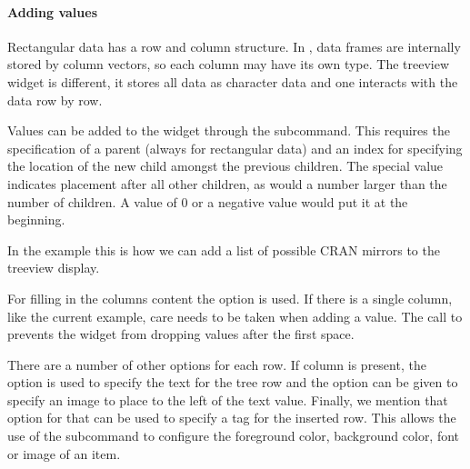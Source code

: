 \paragraph{Adding values}

Rectangular data has a row and column structure. In \R, data frames
are internally stored by column vectors, so each column may have its
own type. The treeview widget is different, it stores all data as
character data and one interacts with the data row by row.

Values can be added to the widget through the
subcommand. This requires the specification of a parent (always
\qcode{} for rectangular data) and an index for specifying the
location of the new child amongst the previous children. The special
value  indicates placement after all other children, as
would a number larger than the number of children. A value of 0 or a
negative value would put it at the beginning.


In the example this is how we can add a list of possible CRAN mirrors
to the treeview display.
\begin{Schunk}
\end{Schunk}

For filling in the columns content the  option is
used. If there is a single column, like the current example, care
needs to be taken when adding a value. The call to
 prevents the widget from dropping values after
the first space.


There are a number of other options for each row. If column 
is present, the  option is used to specify the text for the
tree row and the option  can be given to specify an image
to place to the left of the text value. Finally, we mention that
 option for  that can be used to specify a tag
for the inserted row. This allows the use of the subcommand
 to configure the foreground
color, background color, font or image of an item.



